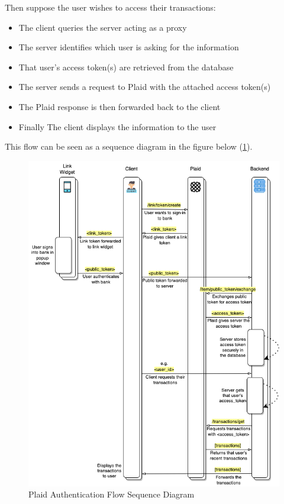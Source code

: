 Then suppose the user wishes to access their transactions:

\begin{itemize}
    \item The client queries the server acting as a proxy
    \item The server identifies which user is asking for the information
    \item That user's access token(s) are retrieved from the database
    \item The server sends a request to Plaid with the attached access token(s)
    \item The Plaid response is then forwarded back to the client
    \item Finally The client displays the information to the user
\end{itemize}

This flow can be seen as a sequence diagram in the figure below (\ref{fig:plaid_auth_flow}).

\begin{figure}[H]
    \centering
    \includegraphics[width=\textwidth]{images/auth_flow_sequence_diagram.png}
    \caption{Plaid Authentication Flow Sequence Diagram}
    \label{fig:plaid_auth_flow}
\end{figure}

